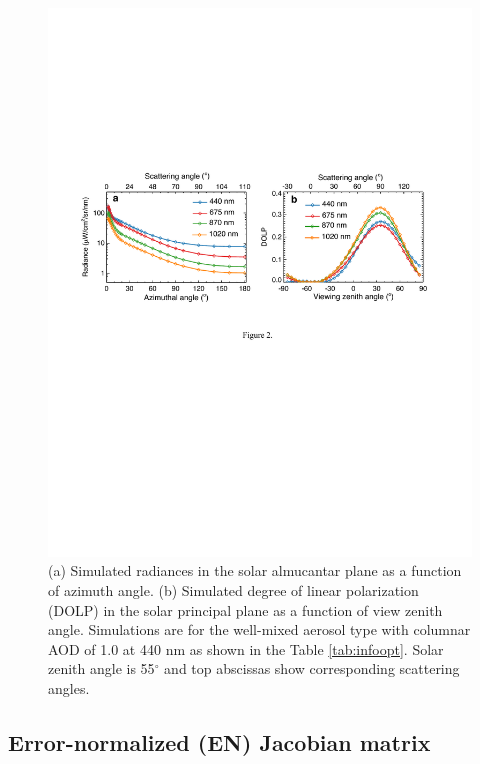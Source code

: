 \begin{figure}[t]
  \centering
  \includegraphics[width={\textwidth}]{figures/info02.pdf}
  \caption{(a) Simulated radiances in the solar almucantar plane as a function
of azimuth angle. (b) Simulated degree of linear polarization (DOLP) in the
solar principal plane as a function of view zenith angle. Simulations are for
the well-mixed aerosol type with columnar AOD of 1.0 at 440 nm as shown in the
Table \ref{tab:infoopt}. Solar zenith angle is 55$^\circ$ and top abscissas 
show corresponding scattering angles.}
  \label{fig:infosimu}
\end{figure}

\subsection{Error-normalized (EN) Jacobian matrix} \label{subsec:enj}

